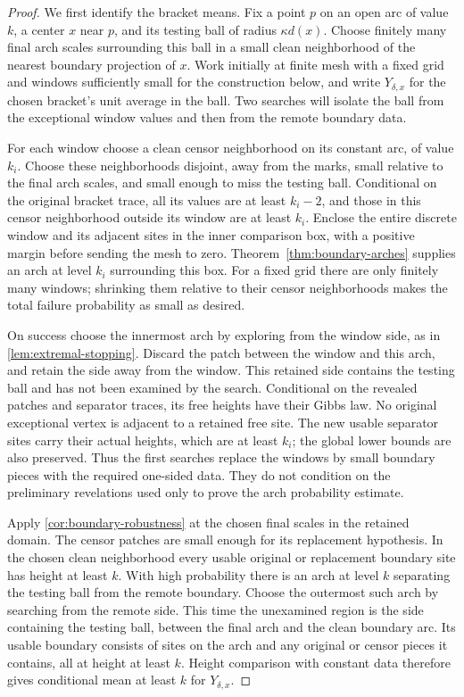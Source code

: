 \begin{proof}
We first identify the bracket means. Fix a point $p$ on an open arc
of value $k$, a center $x$ near $p$, and its testing ball of radius
$\kappa d(x)$. Choose finitely many final arch scales surrounding
this ball in a small clean neighborhood of the nearest boundary
projection of $x$. Work initially at finite mesh with a fixed grid
and windows sufficiently small for the construction below, and write
$Y_{\delta,x}$ for the chosen bracket's unit average in the ball.
Two searches will isolate the ball from the exceptional window values
and then from the remote boundary data.

For each window choose a clean censor neighborhood on its constant
arc, of value $k_i$. Choose these neighborhoods disjoint, away from
the marks, small relative to the final arch scales, and small enough
to miss the testing ball. Conditional
on the original bracket trace, all its values are at least $k_i-2$,
and those in this censor neighborhood outside its window are at least
$k_i$. Enclose the entire discrete window and its adjacent sites in
the inner comparison box, with a positive margin before sending the
mesh to zero. Theorem~\ref{thm:boundary-arches} supplies an arch at
level $k_i$ surrounding this box. For a fixed grid there are only
finitely many windows; shrinking them relative to their censor
neighborhoods makes the total failure probability as small as desired.

On success choose the innermost arch by exploring from the window
side, as in \cref{lem:extremal-stopping}. Discard the patch between
the window and this arch, and retain the side away from the window.
This retained side contains the testing ball and has not been
examined by the search. Conditional on the revealed patches and
separator traces, its free heights have their Gibbs law. No original
exceptional vertex is adjacent to a retained free site. The new usable
separator sites carry their actual heights, which are at least $k_i$;
the global lower bounds are also preserved. Thus the first searches
replace the windows by small boundary pieces with the required
one-sided data. They do not condition on the preliminary revelations
used only to prove the arch probability estimate.

Apply \cref{cor:boundary-robustness} at the chosen final scales in
the retained domain. The censor patches are small enough for its
replacement hypothesis. In the chosen clean neighborhood every usable
original or replacement boundary site has height at least $k$.
With high probability there is an arch at level $k$ separating the
testing ball from the remote boundary. Choose the outermost such
arch by searching from the remote side. This time the unexamined
region is the side containing the testing ball, between the final
arch and the clean boundary arc. Its usable boundary consists of
sites on the arch and any original or censor pieces it contains,
all at height at least $k$. Height comparison with constant data
therefore gives conditional mean at least $k$ for $Y_{\delta,x}$.


\end{proof}
